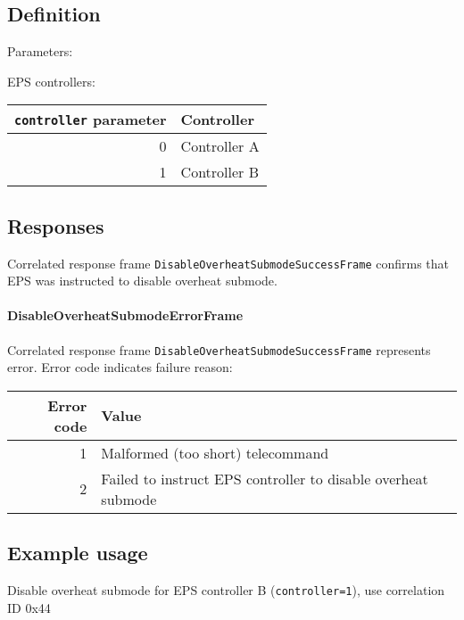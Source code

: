 \subsection{Definition}

Parameters: 

\begin{tcarglist}
\end{tcarglist}

EPS controllers: 

\begin{tabular}{r|l}
	\texttt{controller} parameter & Controller \\ \hline
	0 & Controller A \\
	1 & Controller B
\end{tabular}

\subsection{Responses}
Correlated response frame \texttt{DisableOverheatSubmodeSuccessFrame} confirms that EPS was instructed to disable overheat submode.

\paragraph{DisableOverheatSubmodeErrorFrame}
Correlated response frame \texttt{DisableOverheatSubmodeSuccessFrame} represents error. Error code indicates failure reason:

\begin{tabular}{r | l}
	Error code & Value \\
	\hline
	1 & Malformed (too short) telecommand \\ 
	2 & Failed to instruct EPS controller to disable overheat submode
	
\end{tabular}


\subsection{Example usage}
Disable overheat submode for EPS controller B (\texttt{controller=1}), use correlation ID 0x44

